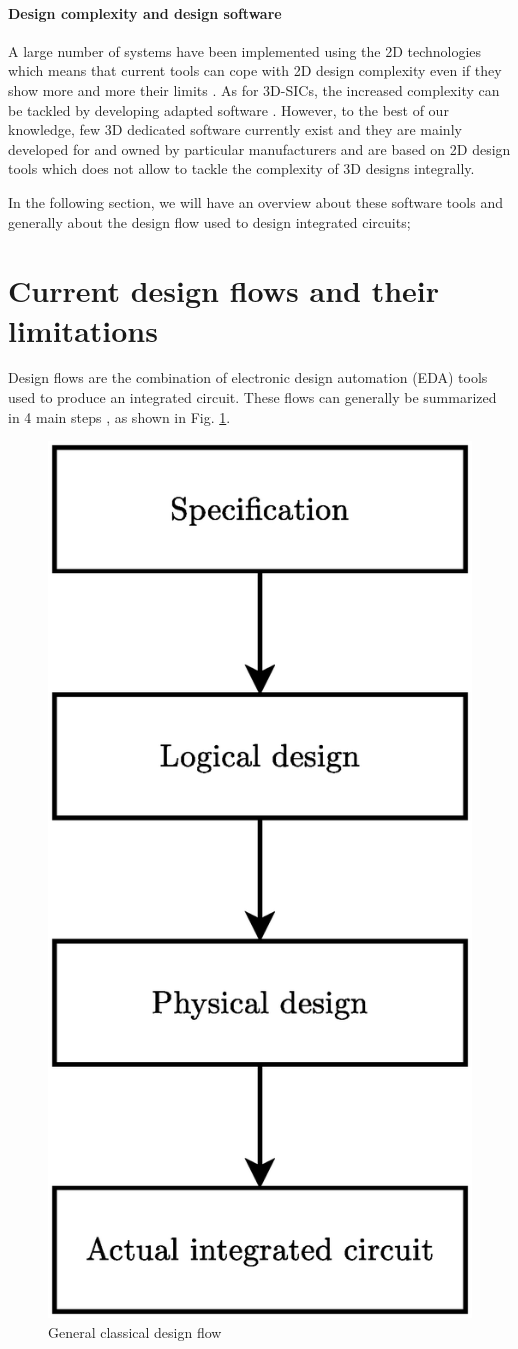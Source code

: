 \paragraph{Design complexity and design software}
A large number of systems have been implemented using the 2D technologies which means that current tools can cope with 2D design complexity even if they show more and more their limits \cite{vanderbiest06, PFF10}. As for 3D-SICs, the increased complexity can be tackled by developing adapted software \cite{659500}. However, to the best of our knowledge, few 3D dedicated software currently exist and they are mainly developed for and owned by particular manufacturers and are based on 2D design tools which does not allow to tackle the complexity of 3D designs integrally.

In the following section, we will have an overview about these software tools and generally about the design flow used to design integrated circuits;

\section{Current design flows and their limitations}

Design flows are the combination of electronic design automation (EDA) tools used to produce an integrated circuit. These flows can generally be summarized in 4 main steps \cite{coursefred}, as shown in Fig. \ref{fig:designflow}.

\begin{figure}[h!]
\begin{center}
\includegraphics[width=0.35\linewidth]{designflow.eps}
\end{center}
\vspace{-0.5cm}
\caption{General classical design flow}
\label{fig:designflow}
\end{figure}

